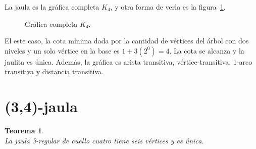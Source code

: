 \documentclass[12pt]{book}
\newtheorem{theorem}{Teorema}
\theoremstyle{definition}
\begin{document}
La jaula es la gráfica completa $K_4$, y otra forma de verla es la figura~\ref{K_4}.

\begin{figure}[htb]
  \centering
  \caption{Gráfica completa $K_4$.} \label{K_4}
\end{figure}

El este caso, la cota mínima dada por la cantidad de vértices del
árbol con dos niveles y un solo vértice en la base es
$1+3(2^{0})=4$. La cota se alcanza y la jaulita es
única. Además, la gráfica es arista transitiva, vértice-transitiva,
1-arco transitiva y distancia transitiva.


\section{(3,4)-jaula}

\begin{theorem}\textbf{}\\\label{teo(3,4)-jaula}
La jaula 3-regular de cuello cuatro tiene seis vértices y es única.
\end{theorem}
\end{document}

